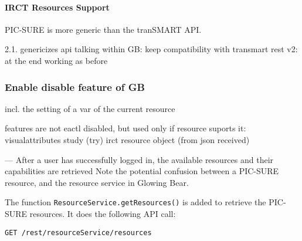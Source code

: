 \paragraph{IRCT Resources Support}





PIC-SURE is more generic than the tranSMART API.

2.1. genericizes api talking within GB: keep compatibility with transmart rest v2: at the end working as before

\subsubsection{Enable disable feature of GB }
incl. the setting of a var of the current resource

features are not eactl disabled, but used only if resource suports it:
visualattributes
study (try)
irct resource object (from json received)



---
After a user has successfully logged in, the available resources and their capabilities are retrieved
Note the potential confusion between a PIC-SURE resource, and the resource service in Glowing Bear.

The function \verb|ResourceService.getResources()| is added to retrieve the PIC-SURE resources. 
It does the following API call:
\begin{verbatim}
GET /rest/resourceService/resources
\end{verbatim}

